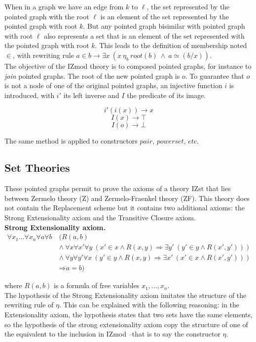 \documentclass[submission,copyright,creativecommons]{eptcs}
\def\lra{\longrightarrow}
\def\imp{\mathbin{\Rightarrow}}
\def\fa{{\forall}}
\def\conj{\mathbin{\wedge}}
\def\ex{{\exists}}
\begin{document}
When in a graph we have an edge from $k$ to $\ell$, the set represented by the pointed graph with the root $\ell$ is an element of the set represented by the pointed graph with root $k$. But any pointed graph bisimilar with pointed graph with root $\ell$ also represents a set that is an element of the set represented with the pointed graph with root $k$. This leads to the definition of membership noted $\in$, with rewriting rule $a \in b \lra \ex x~(x~\eta_b~root(b)~\conj~a \simeq (b/x))$. \\

The objective of the IZmod theory is to composed pointed graphs, for instance to \textit{join} pointed graphs. The root of the new pointed graph is $o$. To guarantee that $o$ is not a node of one of the original pointed graphs, an injective function $i$ is introduced, with $i'$ its left inverse and $I$ the predicate of its image. 

$$i'(i(x)) \lra x$$
$$I(x) \lra \top$$
$$I(o) \lra \bot$$

The same method is applied to constructors $pair$, $powerset$, $etc$.

\subsection{Set Theories}

These pointed graphs permit to prove the axioms of a theory IZst that lies between Zermelo theory (Z) and Zermelo-Fraenkel theory (ZF). This theory does not contain the Replacement scheme but it contains two additional axioms: the Strong Extensionality axiom and the Transitive Closure axiom. \\

\textbf{Strong Extensionality axiom.} 
\begin{equation*}
\begin{split}
\fa x_1...\fa x_n\fa a\fa b~ &(R(a, b) \\
&\conj~\fa x\fa x'\fa y~(x' \in x \conj R(x, y) \imp \ex y'~(y' \in y \conj R(x', y'))) \\
&\conj~\fa y\fa y'\fa x~(y' \in y \conj R(x, y) \imp \ex x'~(x' \in x \conj R(x', y'))) \\
&\imp a = b) 
\end{split}
\end{equation*}

where $R(a,b)$ is a formula of free variables $x_1, ..., x_n$. \\

The hypothesis of the Strong Extensionality axiom imitates the structure of the rewriting rule of $\eta$. This can be explained with the following reasoning: in the Extensionality axiom, the hypothesis states that two sets have the same elements, so the hypothesis of the strong extensionality axiom copy the structure of one of the equivalent to the inclusion in IZmod --that is to say the constructor $\eta$. \\
\end{document}
